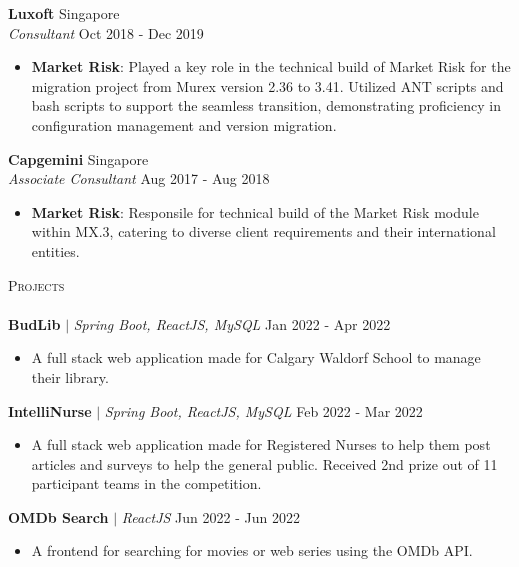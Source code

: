 \documentclass[a4paper]{article}
\newcommand{\lineunder} {
    \vspace*{-8pt} \\
    \hspace*{-18pt} \hrulefill \\
}
\newcommand{\header} [1] {
    {\hspace*{-18pt}\vspace*{6pt} \textsc{#1}}
    \vspace*{-6pt} \lineunder
}
\newcommand{\resumeItemExperience}[2]{
  \item{
    \begin{justify}
    \setlength{\rightskip}{0.15in} \textbf{#1}{: #2 \vspace{-2pt}}
    \end{justify}
  }
}
\newcommand{\resumeItemProject}[1]{
  \item{
    \begin{justify}
    \setlength{\rightskip}{0.15in} {#1 \vspace{-4pt}}
    \end{justify}
  }
}
\begin{document}
\textbf{Luxoft} \hfill Singapore\\
\textit{Consultant} \hfill Oct 2018 - Dec 2019\\
\vspace{-1mm}
\begin{itemize} \itemsep 1pt
    \resumeItemExperience{Market Risk} {Played a key role in the technical build of Market Risk for the migration project from Murex version 2.36 to 3.41. Utilized ANT scripts and bash scripts to support the seamless transition, demonstrating proficiency in configuration management and version migration.}
\end{itemize}

\textbf{Capgemini} \hfill Singapore\\
\textit{Associate Consultant} \hfill Aug 2017 - Aug 2018\\
\vspace{-1mm}
\begin{itemize} \itemsep 1pt
    \resumeItemExperience{Market Risk} {Responsile for technical build of the Market Risk module within MX.3, catering to diverse client requirements and their international entities.}
\end{itemize}


\header{Projects}
\vspace{1mm}
{\textbf{BudLib}} $|$ \emph{Spring Boot, ReactJS, MySQL} \hfill {Jan 2022 - Apr 2022}
\begin{itemize}
    \resumeItemProject {A full stack web application made for Calgary Waldorf School to manage their library.}


\end{itemize}
\vspace*{1mm}
{\textbf{IntelliNurse}} $|$ \emph{Spring Boot, ReactJS, MySQL} \hfill {Feb 2022 - Mar 2022}
\begin{itemize}
    \resumeItemProject {A full stack web application made for Registered Nurses to help them post articles and surveys to help the general public. Received 2nd prize out of 11 participant teams in the competition.}

\end{itemize}
\vspace*{1mm}
{\textbf{OMDb Search}} $|$ \emph{ReactJS} \hfill {Jun 2022 - Jun 2022}
\begin{itemize}
    \resumeItemProject {A frontend for searching for movies or web series using the OMDb API.}
\vspace*{1mm}
\end{itemize}
\end{document}
